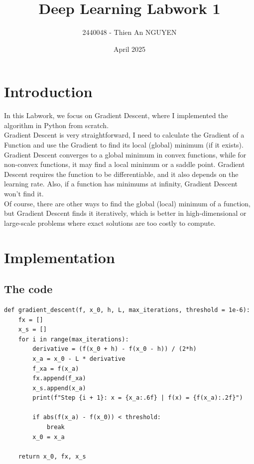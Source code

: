 \documentclass{article}
\title{Deep Learning Labwork 1}
\author{2440048 - Thien An NGUYEN}
\date{April 2025}
\begin{document}
\maketitle

\section{Introduction}
In this Labwork, we focus on Gradient Descent, where I implemented the algorithm in Python from scratch.\\
\noindent Gradient Descent is very straightforward, I need to calculate the Gradient of a Function and use the Gradient to find its local (global) minimum (if it exists). Gradient Descent converges to a global minimum in convex functions, while for non-convex functions, it may find a local minimum or a saddle point. Gradient Descent requires the function to be differentiable, and it also depends on the learning rate. Also, if a function has minimums at infinity, Gradient Descent won’t find it.\\
\noindent Of course, there are other ways to find the global (local) minimum of a function, but Gradient Descent finds it iteratively, which is better in high-dimensional or large-scale problems where exact solutions are too costly to compute.

\section{Implementation}
\subsection{The code}
\begin{verbatim}
def gradient_descent(f, x_0, h, L, max_iterations, threshold = 1e-6):
    fx = []
    x_s = []
    for i in range(max_iterations):
        derivative = (f(x_0 + h) - f(x_0 - h)) / (2*h)
        x_a = x_0 - L * derivative
        f_xa = f(x_a)
        fx.append(f_xa)
        x_s.append(x_a)
        print(f"Step {i + 1}: x = {x_a:.6f} | f(x) = {f(x_a):.2f}")

        if abs(f(x_a) - f(x_0)) < threshold:
            break
        x_0 = x_a

    return x_0, fx, x_s
\end{verbatim}
\end{document}

